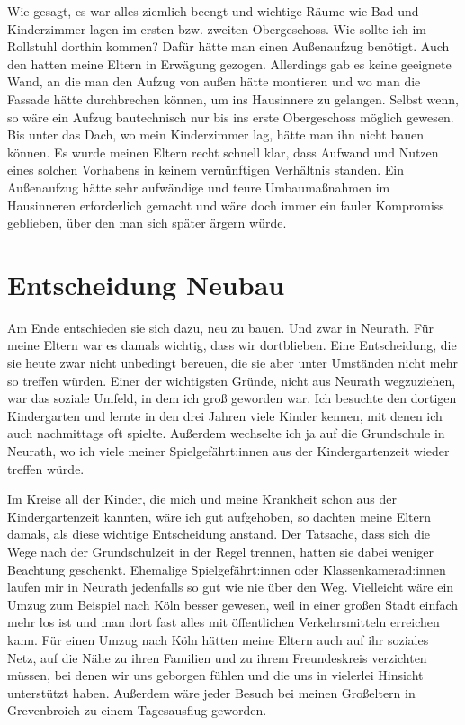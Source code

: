 \documentclass[fontsize=12pt,a4paper,headinclude,DIV=calc,automark]{scrbook}
\begin{document}
Wie gesagt, es war alles ziemlich beengt und wichtige Räume wie Bad und Kinderzimmer lagen im ersten bzw. zweiten Obergeschoss. Wie sollte ich im Rollstuhl dorthin kommen? Dafür hätte man einen Außenaufzug benötigt. Auch den hatten meine Eltern in Erwägung gezogen. Allerdings gab es keine geeignete Wand, an die man den Aufzug von außen hätte montieren und wo man die Fassade hätte durchbrechen können, um ins Hausinnere zu gelangen. Selbst wenn, so wäre ein Aufzug bautechnisch nur bis ins erste Obergeschoss möglich gewesen. Bis unter das Dach, wo mein Kinderzimmer lag, hätte man ihn nicht bauen können. Es wurde meinen Eltern recht schnell klar, dass Aufwand und Nutzen eines solchen Vorhabens in keinem vernünftigen Verhältnis standen. Ein Außenaufzug hätte sehr aufwändige und teure Umbaumaßnahmen im Hausinneren erforderlich gemacht und wäre doch immer ein fauler Kompromiss geblieben, über den man sich später ärgern würde.

\section{Entscheidung Neubau}

Am Ende entschieden sie sich dazu, neu zu bauen. Und zwar in Neurath. Für meine Eltern war es damals wichtig, dass wir dortblieben. Eine Entscheidung, die sie heute zwar nicht unbedingt bereuen, die sie aber unter Umständen nicht mehr so treffen würden. Einer der wichtigsten Gründe, nicht aus Neurath wegzuziehen, war das soziale Umfeld, in dem ich groß geworden war. Ich besuchte den dortigen Kindergarten und lernte in den drei Jahren viele Kinder kennen, mit denen ich auch nachmittags oft spielte. Außerdem wechselte ich ja auf die Grundschule in Neurath, wo ich viele meiner Spielgefährt:innen aus der Kindergartenzeit wieder treffen würde.

Im Kreise all der Kinder, die mich und meine Krankheit schon aus der Kindergartenzeit kannten, wäre ich gut aufgehoben, so dachten meine Eltern damals, als diese wichtige Entscheidung anstand. Der Tatsache, dass sich die Wege nach der Grundschulzeit in der Regel trennen, hatten sie dabei weniger Beachtung geschenkt. Ehemalige Spielgefährt:innen oder Klassenkamerad:innen laufen mir in Neurath jedenfalls so gut wie nie über den Weg. Vielleicht wäre ein Umzug zum Beispiel nach Köln besser gewesen, weil in einer großen Stadt einfach mehr los ist und man dort fast alles mit öffentlichen Verkehrsmitteln erreichen kann. Für einen Umzug nach Köln hätten meine Eltern auch auf ihr soziales Netz, auf die Nähe zu ihren Familien und zu ihrem Freundeskreis verzichten müssen, bei denen wir uns geborgen fühlen und die uns in vielerlei Hinsicht unterstützt haben. Außerdem wäre jeder Besuch bei meinen Großeltern in Grevenbroich zu einem Tagesausflug geworden.
\end{document}
